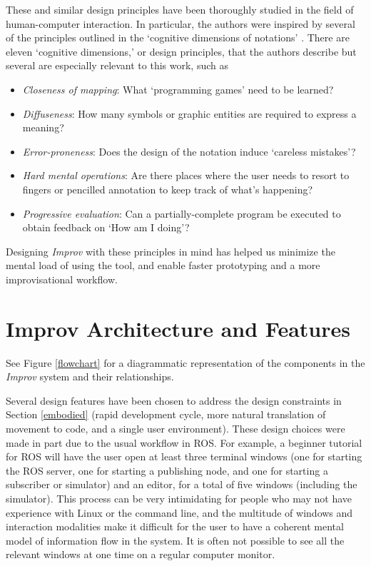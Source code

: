 \documentclass[sigconf]{acmart}
\begin{document}
These and similar design principles have been thoroughly studied in the field
of human-computer interaction. In particular, the authors were inspired by several of the principles
outlined in the `cognitive dimensions of notations' \cite{green1996usability}.
There are eleven `cognitive dimensions,' or design principles, that the authors
describe but several are especially relevant to this work, such as

\begin{itemize}
\item \emph{Closeness of mapping}: What `programming games' need to be learned?
\item \emph{Diffuseness}: How many symbols or graphic entities are required to express a meaning?
\item \emph{Error-proneness}: Does the design of the notation induce `careless mistakes'?
\item \emph{Hard mental operations}: Are there places where the user needs to resort to  fingers or pencilled annotation to keep track of what's happening?
\item \emph{Progressive evaluation}: Can a partially-complete program be executed to
obtain feedback on `How am I doing'?
\end{itemize}

Designing \emph{Improv} with these principles in mind has helped us minimize the mental
load of using the tool, and enable faster prototyping and a more
improvisational workflow.

\section{Improv Architecture and Features}\label{architecture-overview}

See Figure \ref{flowchart} for a diagrammatic representation of
the components in the \emph{Improv} system and their relationships.

Several design features have been chosen to
address the design constraints in Section \ref{embodied} (rapid development
cycle, more natural translation of movement to code, and a single user environment).
These design choices were made in part due to the usual workflow in ROS. For
example, a beginner tutorial for ROS will have the user open at least three
terminal windows (one for starting the ROS server, one for starting a
publishing node, and one for starting a subscriber or simulator) and an editor,
for a total of five windows (including the simulator). This process can be very
intimidating for people who may not have experience with Linux or the command
line, and the multitude of windows and interaction modalities make it difficult
for the user to have a coherent mental model of information flow in the system.
It is often not possible to see all the relevant windows at one time on a
regular computer monitor.
\end{document}
